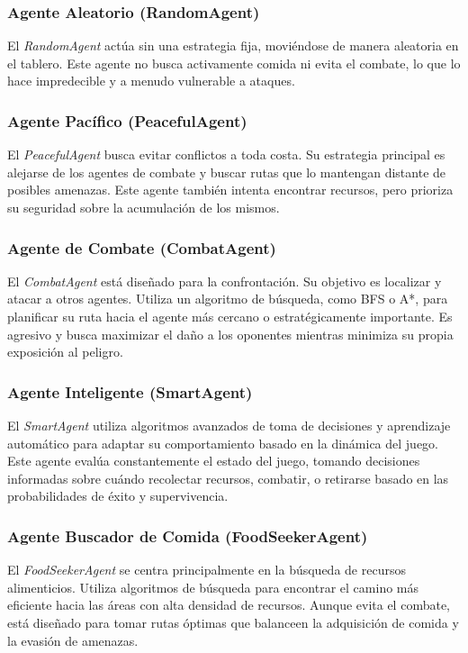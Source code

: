 \documentclass[11pt]{article}
\begin{document}
\subsubsection{Agente Aleatorio (RandomAgent)}
El \textit{RandomAgent} actúa sin una estrategia fija, moviéndose de manera aleatoria en el tablero. Este agente no busca activamente comida ni evita el combate, lo que lo hace impredecible y a menudo vulnerable a ataques.

\subsubsection{Agente Pacífico (PeacefulAgent)}
El \textit{PeacefulAgent} busca evitar conflictos a toda costa. Su estrategia principal es alejarse de los agentes de combate y buscar rutas que lo mantengan distante de posibles amenazas. Este agente también intenta encontrar recursos, pero prioriza su seguridad sobre la acumulación de los mismos.

\subsubsection{Agente de Combate (CombatAgent)}
El \textit{CombatAgent} está diseñado para la confrontación. Su objetivo es localizar y atacar a otros agentes. Utiliza un algoritmo de búsqueda, como BFS o A*, para planificar su ruta hacia el agente más cercano o estratégicamente importante. Es agresivo y busca maximizar el daño a los oponentes mientras minimiza su propia exposición al peligro.

\subsubsection{Agente Inteligente (SmartAgent)}
El \textit{SmartAgent} utiliza algoritmos avanzados de toma de decisiones y aprendizaje automático para adaptar su comportamiento basado en la dinámica del juego. Este agente evalúa constantemente el estado del juego, tomando decisiones informadas sobre cuándo recolectar recursos, combatir, o retirarse basado en las probabilidades de éxito y supervivencia.

\subsubsection{Agente Buscador de Comida (FoodSeekerAgent)}
El \textit{FoodSeekerAgent} se centra principalmente en la búsqueda de recursos alimenticios. Utiliza algoritmos de búsqueda para encontrar el camino más eficiente hacia las áreas con alta densidad de recursos. Aunque evita el combate, está diseñado para tomar rutas óptimas que balanceen la adquisición de comida y la evasión de amenazas.
\end{document}
